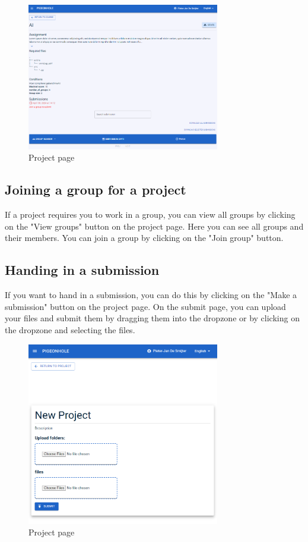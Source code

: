 \documentclass{article}
\begin{document}
\begin{figure}[H]
    \centering
    \includegraphics[width=0.75\textwidth]{images/projectpage.png}
    \caption{Project page}
\end{figure}

\subsection{Joining a group for a project}
If a project requires you to work in a group, you can view all groups by clicking on the "View groups" button on the project page. Here you can see all groups and their members. You can join a group by clicking on the "Join group" button.

\subsection{Handing in a submission}
If you want to hand in a submission, you can do this by clicking on the "Make a submission" button on the project page. On the submit page, you can upload your files and submit them by dragging them into the dropzone or by clicking on the dropzone and selecting the files.

\begin{figure}[H]
    \centering
    \includegraphics[width=0.75\textwidth]{images/submit.png}
    \caption{Project page}
\end{figure}
\end{document}
